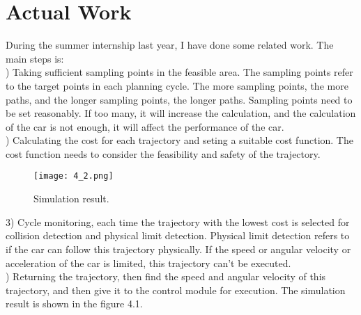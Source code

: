 \documentclass{report}
\begin{document}
 \chapter{Actual Work}
 During the summer internship last year, I have done some related work. The main steps is:\\
 ) Taking sufficient sampling points in the feasible area. The sampling points refer to the target points in each planning cycle. The more sampling points, the more paths, and the longer sampling points, the longer paths. Sampling points need to be set reasonably. If too many, it will increase the calculation, and the calculation of the car is not enough, it will affect the performance of the car.\\
 ) Calculating the cost for each trajectory and seting a suitable cost function. The cost function needs to consider the feasibility and safety of the trajectory.\\
 \indent
    \begin{figure}[ht]
 	\centering
 	\texttt{[image: 4\_2.png]}
 	\caption{Simulation result.}
 	\label{fig:4.1} 
 \end{figure}
 3) Cycle monitoring, each time the trajectory with the lowest cost is selected for collision detection and physical limit detection. Physical limit detection refers to if the car can follow this trajectory physically. If the speed or angular velocity or acceleration of the car is limited,  this trajectory can't be executed.\\
 ) Returning the trajectory, then find the speed and angular velocity of this trajectory, and then give it to the control module for execution. The simulation result is shown in the figure 4.1.
 
 
 
% 
% 
 
 
 
 
 
 
 
 
\end{document}
